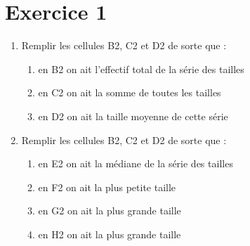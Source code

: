 \def\authors{PESIN - CADOT - COURTIN}
\def\theme{TP - Statistiques}

\section*{Exercice 1}

\begin{enumerate}
    \item 
    Remplir les cellules B2, C2 et D2 de sorte que : 
    \begin{enumerate}
        \item en B2 on ait l’effectif total de la série des tailles
        \item en C2 on ait la somme de toutes les tailles
        \item en D2 on ait la taille moyenne de cette série
    \end{enumerate}
    \item
    Remplir les cellules B2, C2 et D2 de sorte que : 
    \begin{enumerate}
        \item en E2 on ait la médiane de la série des tailles
        \item en F2 on ait la plus petite taille
        \item en G2 on ait la plus grande taille
        \item en H2 on ait la plus grande taille
    \end{enumerate}
\end{enumerate}
